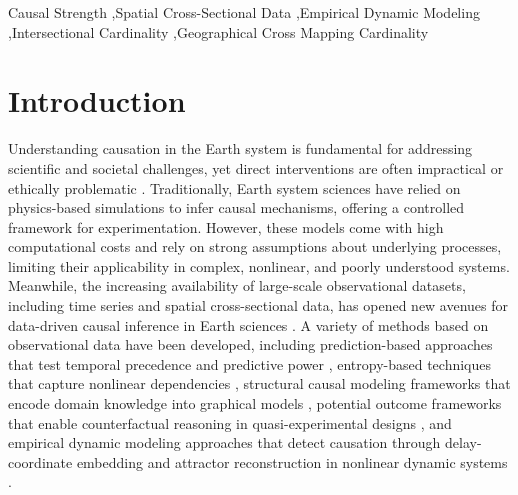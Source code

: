 \documentclass[authoryear,preprint,review,12pt]{elsarticle}
\begin{document}
\begin{frontmatter}
\begin{abstract}
\end{abstract}

\begin{keyword}
Causal Strength \sep Spatial Cross-Sectional Data \sep Empirical Dynamic Modeling \sep Intersectional Cardinality \sep Geographical Cross Mapping Cardinality
\end{keyword}

\end{frontmatter}

\linenumbers


 \section{Introduction}

Understanding causation in the Earth system is fundamental for addressing scientific and societal challenges, yet direct interventions are often impractical or ethically problematic \citep{gao2022tscess,runge2023tsc,gao2023gccm}. Traditionally, Earth system sciences have relied on physics-based simulations to infer causal mechanisms, offering a controlled framework for experimentation. However, these models come with high computational costs and rely on strong assumptions about underlying processes, limiting their applicability in complex, nonlinear, and poorly understood systems. Meanwhile, the increasing availability of large-scale observational datasets, including time series and spatial cross-sectional data, has opened new avenues for data-driven causal inference in Earth sciences \citep{runge2019esstsc,runge2023tsc}. A variety of methods based on observational data have been developed, including prediction-based approaches that test temporal precedence and predictive power \citep{granger1969grangertest,geweke1982grangertest2}, entropy-based techniques that capture nonlinear dependencies \citep{schreiber2000te1,vicente2010te2,sun2014ce1}, structural causal modeling frameworks that encode domain knowledge into graphical models \citep{pearl2000scm2,pearl2009scm3,pearl2018scm4}, potential outcome frameworks that enable counterfactual reasoning in quasi-experimental designs \citep{rubin1974pom1,rubin1986pom2,rubin2005pom3}, and empirical dynamic modeling approaches that detect causation through delay-coordinate embedding and attractor reconstruction in nonlinear dynamic systems \citep{sugihara2012ccm,ma2014cms,clark2015multispatialccm}.
\end{document}
